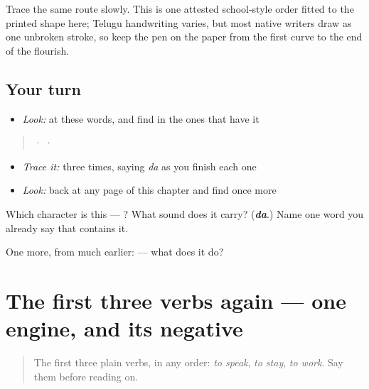 Trace the same route slowly. This is one attested school-style order fitted to the printed shape here; Telugu handwriting varies, but most native writers draw  as one unbroken stroke, so keep the pen on the paper from the first curve to the end of the flourish.

\subsection*{Your turn}
\begin{itemize}
\raggedright
  \item \emph{Look:} at these words, and find  in the ones that have it
\end{itemize}

\begin{quote}
  ·    ·  
\end{quote}

\begin{itemize}
\raggedright
  \item \emph{Trace it:}  three times, saying \emph{da} as you finish each one
  \item \emph{Look:} back at any page of this chapter and find  once more
\end{itemize}

\begin{tcolorbox}[breakable,colback=teal!4,colframe=teal!35!black,title={Before you move on}]
Which character is this — ? What sound does it carry? (\emph{\textbf{da}}.) Name one word you already say that contains it.

One more, from much earlier:  — what does it do?
\end{tcolorbox}
\section[(dialogue)]{The first three verbs again — one engine, and its negative}

\label{lesson:TE-C12-second-pass-verbs}



\begin{quote}
The first three plain verbs, in any order: \emph{to speak}, \emph{to stay}, \emph{to work}. Say them before reading on.
\end{quote}

